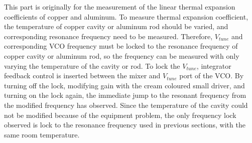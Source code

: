 This part is originally for the measurement of the linear thermal expansion coefficients of copper and aluminum. To measure thermal expansion coefficient, the temperature of copper cavity or aluminum rod should be varied, and corresponding resonance frequency need to be measured. Therefore, $V_{tune}$ and corresponding VCO frequency must be locked to the resonance frequency of copper cavity or aluminum rod, so the frequency can be measured with only varying the temperature of the cavity or rod. To lock the $V_{tune}$, integrator feedback control is inserted between the mixer and $V_{tune}$ port of the VCO. By turning off the lock, modifying gain with the cream coloured small driver, and turning on the lock again, the immediate jump to the resonant frequency from the modified frequency has observed. Since the temperature of the cavity could not be modified because of the equipment problem, the only frequency lock observed is lock to the resonance frequency used in previous sections, with the same room temperature.\\
